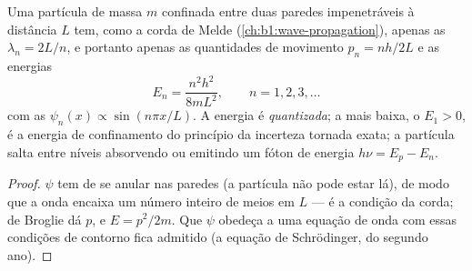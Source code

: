 \begin{proposition}\label{prop:b1:quantum-introduction:box}
Uma partícula de massa $m$ confinada entre duas paredes impenetráveis à
distância $L$ tem, como a corda de Melde
(\cref{ch:b1:wave-propagation}), apenas as  $\lambda_n = 2L/n$,
e portanto apenas as quantidades de movimento $p_n = nh/2L$ e as energias
\[
E_n = \frac{n^2h^2}{8mL^2} , \qquad n = 1, 2, 3, \ldots
\]
com as  $\psi_n(x) \propto \sin(n\pi x/L)$. A energia é
\emph{quantizada}; a mais baixa, o \emph{} $E_1 > 0$, é a
energia de confinamento do princípio da incerteza tornada exata; a
partícula salta entre níveis absorvendo ou emitindo um fóton de
energia $h\nu = E_p - E_n$.
\end{proposition}

\begin{proof}
$\psi$ tem de se anular nas paredes (a partícula não pode estar lá), de modo que a
onda encaixa um número inteiro de meios  em $L$ --- é a
condição da corda; de Broglie dá $p$, e $E = p^2/2m$. Que $\psi$ obedeça
a uma equação de onda com essas condições de contorno fica admitido (a
equação de Schrödinger, do segundo ano).
\end{proof}

